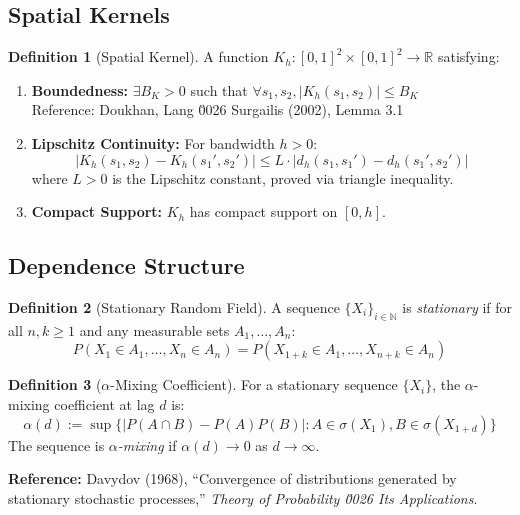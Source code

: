 \documentclass[11pt,a4paper]{amsart}
\theoremstyle{definition}
\newtheorem{definition}{Definition}[section]
\newcommand{\R}{\mathbb{R}}
\newcommand{\N}{\mathbb{N}}
\begin{document}
\subsection{Spatial Kernels}

\begin{definition}[Spatial Kernel]
A function $K_h : [0,1]^2 \times [0,1]^2 \to \R$ satisfying:
\begin{enumerate}
\item \textbf{Boundedness:} $\exists B_K > 0$ such that $\forall s_1, s_2, |K_h(s_1, s_2)| \leq B_K$\\
Reference: Doukhan, Lang \u0026 Surgailis (2002), Lemma 3.1

\item \textbf{Lipschitz Continuity:} For bandwidth $h > 0$:
\begin{equation*}
|K_h(s_1, s_2) - K_h(s_1', s_2')| \leq L \cdot |d_h(s_1, s_1') - d_h(s_1', s_2')|
\end{equation*}
where $L > 0$ is the Lipschitz constant, proved via triangle inequality.

\item \textbf{Compact Support:} $K_h$ has compact support on $[0,h]$.
\end{enumerate}
\end{definition}

\subsection{Dependence Structure}

\begin{definition}[Stationary Random Field]
A sequence $\{X_i\}_{i \in \N}$ is \emph{stationary} if for all $n, k \geq 1$ and any 
measurable sets $A_1, \dots, A_n$:
\begin{equation*}
P(X_1 \in A_1, \dots, X_n \in A_n) = P(X_{1+k} \in A_1, \dots, X_{n+k} \in A_n)
\end{equation*}
\end{definition}

\begin{definition}[$\alpha$-Mixing Coefficient]
For a stationary sequence $\{X_i\}$, the $\alpha$-mixing coefficient at lag $d$ is:
\begin{equation*}
\alpha(d) := \sup\{|P(A \cap B) - P(A)P(B)| : A \in \sigma(X_1), B \in \sigma(X_{1+d})\}
\end{equation*}
The sequence is \emph{$\alpha$-mixing} if $\alpha(d) \to 0$ as $d \to \infty$.

\textbf{Reference:} Davydov (1968), ``Convergence of distributions generated by 
stationary stochastic processes,'' \textit{Theory of Probability \u0026 Its Applications}.
\end{definition}
\end{document}
